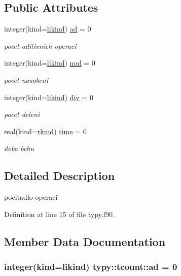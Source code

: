 \subsection*{\-Public \-Attributes}
\begin{DoxyCompactItemize}
\item 
integer(kind=\hyperlink{classtypy_a2d07d3bd8360ffc201ade93859a7cc84}{likind}) \hyperlink{structtypy_1_1tcount_a76331414c9c7faa2ffcef099a188c5a0}{ad} = 0
\begin{DoxyCompactList}\small\item\em pocet aditivnich operaci \end{DoxyCompactList}\item 
integer(kind=\hyperlink{classtypy_a2d07d3bd8360ffc201ade93859a7cc84}{likind}) \hyperlink{structtypy_1_1tcount_acb3e84ceaddd7603add14a6a634be6ed}{mul} = 0
\begin{DoxyCompactList}\small\item\em pocet nasobeni \end{DoxyCompactList}\item 
integer(kind=\hyperlink{classtypy_a2d07d3bd8360ffc201ade93859a7cc84}{likind}) \hyperlink{structtypy_1_1tcount_a56f7ee9e379fb0657fc6729ae0e8eedc}{div} = 0
\begin{DoxyCompactList}\small\item\em pocet deleni \end{DoxyCompactList}\item 
real(kind=\hyperlink{classtypy_a2169287dfed38b596625c595cf3b5677}{rkind}) \hyperlink{structtypy_1_1tcount_a39ec51004274c0e7e2cd7142aa55cfcd}{time} = 0
\begin{DoxyCompactList}\small\item\em doba behu \end{DoxyCompactList}\end{DoxyCompactItemize}


\subsection{\-Detailed \-Description}
pocitadlo operaci 

\-Definition at line 15 of file typy.\-f90.



\subsection{\-Member \-Data \-Documentation}
\hypertarget{structtypy_1_1tcount_a76331414c9c7faa2ffcef099a188c5a0}{
\subsubsection[{ad}]{\setlength{\rightskip}{0pt plus 5cm}integer(kind={\bf likind}) {\bf typy\-::tcount\-::ad} = 0}}\label{structtypy_1_1tcount_a76331414c9c7faa2ffcef099a188c5a0}


